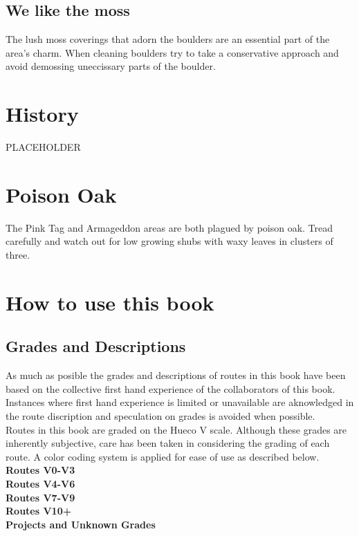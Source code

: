 \subsection*{We like the moss}
The lush moss coverings that adorn the boulders are an essential part of the area's charm. When cleaning boulders try to take a conservative approach and avoid demossing uneccissary parts of the boulder.
\section{History}
PLACEHOLDER
\section{Poison Oak}
The Pink Tag and Armageddon areas are both plagued by poison oak. Tread carefully and watch out for low growing shubs with waxy leaves in clusters of three.
\section{How to use this book}
\subsection*{Grades and Descriptions}
As much as posible the grades and descriptions of routes in this book have been based on the collective first hand experience of the collaborators of this book. Instances where first hand experience is limited or unavailable are aknowledged in the route discription and speculation on grades is avoided when possible. \\
Routes in this book are graded on the Hueco V scale. Although these grades are inherently subjective, care has been taken in considering the grading of each route. A color coding system is applied for ease of use as described below.\\
\colorbox{green!20}{\textbf{Routes V0-V3}}\\
\colorbox{RoyalBlue!20}{\textbf{Routes V4-V6}}\\
\colorbox{Goldenrod!50}{\textbf{Routes V7-V9}}\\
\colorbox{red!20}{\textbf{Routes V10+}}\\
\colorbox{black!20}{\textbf{Projects and Unknown Grades}}\\
